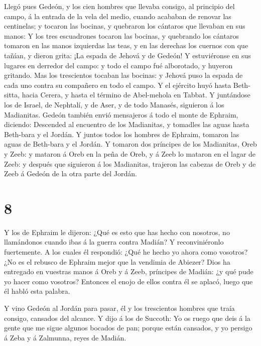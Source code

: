  Llegó pues Gedeón, y los cien hombres que llevaba consigo,
al principio del campo, á la entrada de la vela del medio, cuando
acababan de renovar las centinelas; y tocaron las bocinas, y quebraron
los cántaros que llevaban en sus manos:  Y los tres
escuadrones tocaron las bocinas, y quebrando los cántaros tomaron en las
manos izquierdas las teas, y en las derechas los cuernos con que tañían,
y dieron grita: ¡La espada de Jehová y de Gedeón!  Y
estuviéronse en sus lugares en derredor del campo: y todo el campo fué
alborotado, y huyeron gritando.  Mas los trescientos
tocaban las bocinas: y Jehová puso la espada de cada uno contra su
compañero en todo el campo. Y el ejército huyó hasta Beth-sitta, hacia
Cerera, y hasta el término de Abel-mehola en Tabbat.  Y
juntándose los de Israel, de Nephtalí, y de Aser, y de todo Manasés,
siguieron á los Madianitas.  Gedeón también envió
mensajeros á todo el monte de Ephraim, diciendo: Descended al encuentro
de los Madianitas, y tomadles las aguas hasta Beth-bara y el Jordán. Y
juntos todos los hombres de Ephraim, tomaron las aguas de Beth-bara y el
Jordán.  Y tomaron dos príncipes de los Madianitas, Oreb y
Zeeb: y mataron á Oreb en la peña de Oreb, y á Zeeb lo mataron en el
lagar de Zeeb: y después que siguieron á los Madianitas, trajeron las
cabezas de Oreb y de Zeeb á Gedeón de la otra parte del Jordán.

\hypertarget{section-7}{%
\section{8}\label{section-7}}

 Y los de Ephraim le dijeron: ¿Qué es esto que has hecho con
nosotros, no llamándonos cuando ibas á la guerra contra Madián? Y
reconviniéronlo fuertemente.  A los cuales él respondió:
¿Qué he hecho yo ahora como vosotros? ¿No es el rebusco de Ephraim mejor
que la vendimia de Abiezer?  Dios ha entregado en vuestras
manos á Oreb y á Zeeb, príncipes de Madián: ¿y qué pude yo hacer como
vosotros? Entonces el enojo de ellos contra él se aplacó, luego que él
habló esta palabra.

 Y vino Gedeón al Jordán para pasar, él y los trescientos
hombres que traía consigo, cansados del alcance.  Y dijo á
los de Succoth: Yo os ruego que deis á la gente que me sigue algunos
bocados de pan; porque están cansados, y yo persigo á Zeba y á Zalmunna,
reyes de Madián.

